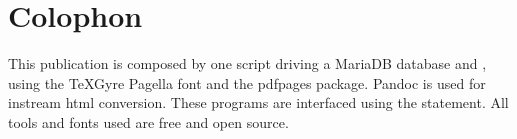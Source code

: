 \small
\chapter*{Colophon}
\begin{multicols*}{2}
This publication is composed by one \rexx{} script driving a MariaDB
database and \XeLaTeX, using the \TeX  Gyre Pagella font and the
pdfpages package. Pandoc is used for instream html conversion.
These programs are interfaced using the \rexx{}
 statement. All tools and fonts used are free and open
source.
\end{multicols*}
